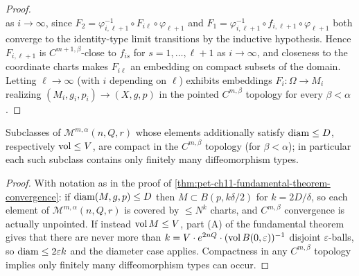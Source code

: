 \begin{proof}
\[  \]
  as $i\to\infty$, since $F_2=\varphi_{i,\ell+1}^{-1}\circ F_{i\ell}\circ\varphi_{\ell+1}$
  and $F_1=\varphi_{i,\ell+1}^{-1}\circ f_{i,\ell+1}\circ\varphi_{\ell+1}$
  both converge to the identity-type limit transitions by the inductive
  hypothesis. Hence $F_{i,\ell+1}$ is $C^{m+1,\beta}$-close to $f_{is}$ for
  $s=1,\dots,\ell+1$ as $i\to\infty$, and closeness to the coordinate charts
  makes $F_{i\ell}$ an embedding on compact subsets of the domain. Letting
  $\ell\to\infty$ (with $i$ depending on $\ell$) exhibits embeddings
  $F_i:\Omega\to M_i$ realizing $(M_i,g_i,p_i)\to(X,g,p)$ in the pointed
  $C^{m,\beta}$ topology for every $\beta<\alpha$.
\end{proof}

\begin{corollary}
  \label{cor:pet-ch11-fundamental-thm-diam-vol-bounded}
  Subclasses of $\mathcal{M}^{m,\alpha}(n,Q,r)$ whose elements additionally
  satisfy $\operatorname{diam}\le D$, respectively $\operatorname{vol}\le V$, are compact in the
  $C^{m,\beta}$ topology (for $\beta<\alpha$); in particular each such
  subclass contains only finitely many diffeomorphism types.
\end{corollary}
\begin{proof}
  With notation as in the proof of
  \cref{thm:pet-ch11-fundamental-theorem-convergence}: if $\operatorname{diam}(M,g,p)\le D$
  then $M\subset B(p,k\delta/2)$ for $k=2D/\delta$, so each element of
  $\mathcal{M}^{m,\alpha}(n,Q,r)$ is covered by $\le N^k$ charts, and
  $C^{m,\beta}$ convergence is actually unpointed. If instead $\operatorname{vol} M\le V$,
  part (A) of the fundamental theorem gives that there are never more than
  $k=V\cdot e^{2nQ}\cdot(\operatorname{vol} B(0,\varepsilon))^{-1}$ disjoint
  $\varepsilon$-balls, so $\operatorname{diam}\le2\varepsilon k$ and the diameter case
  applies. Compactness in any $C^{m,\beta}$ topology implies only finitely
  many diffeomorphism types can occur.
\end{proof}

